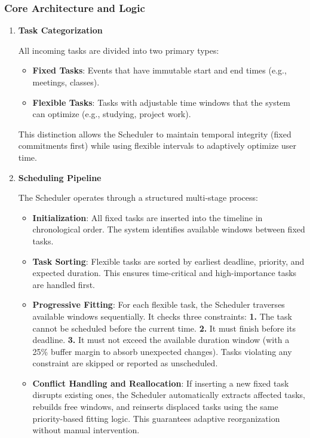\documentclass[12pt, a4paper]{article}
\begin{document}
        \subsubsection{Core Architecture and Logic}

            \begin{enumerate}
                \item \textbf{Task Categorization}

                    All incoming tasks are divided into two primary types: 

                    \begin{itemize}
                        \item \textbf{Fixed Tasks}: Events that have immutable start and end times (e.g., meetings, classes).
                        \item \textbf{Flexible Tasks}: Tasks with adjustable time windows that the system can optimize (e.g., studying, project work).
                    \end{itemize}

                    This distinction allows the Scheduler to maintain temporal integrity (fixed commitments first) while using flexible intervals to adaptively optimize user time.

                \item \textbf{Scheduling Pipeline}

                    The Scheduler operates through a structured multi-stage process:

                    \begin{itemize}
                        \item \textbf{Initialization}: All fixed tasks are inserted into the timeline in chronological order. The system identifies available windows between fixed tasks. 
                        \item \textbf{Task Sorting}: Flexible tasks are sorted by earliest deadline, priority, and expected duration. This ensures time-critical and high-importance tasks are handled first.
                        \item \textbf{Progressive Fitting}: For each flexible task, the Scheduler traverses available windows sequentially. It checks three constraints: \textbf{1.} The task cannot be scheduled before the current time. \textbf{2.} It must finish before its deadline. \textbf{3.} It must not exceed the available duration window (with a 25\% buffer margin to absorb unexpected changes). Tasks violating any constraint are skipped or reported as unscheduled.
                        \item \textbf{Conflict Handling and Reallocation}: If inserting a new fixed task disrupts existing ones, the Scheduler automatically extracts affected tasks, rebuilds free windows, and reinserts displaced tasks using the same priority-based fitting logic. This guarantees adaptive reorganization without manual intervention.
                    \end{itemize}
            \end{enumerate}
\end{document}
